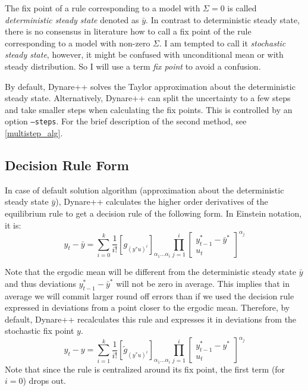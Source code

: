 \documentclass[10pt]{article}
\begin{document}
The fix point of a rule corresponding to a model with $\Sigma=0$ is
called {\it deterministic steady state} denoted as $\bar y$. In
contrast to deterministic steady state, there is no consensus in
literature how to call a fix point of the rule corresponding to a
model with non-zero $\Sigma$. I am tempted to call it {\it stochastic
  steady state}, however, it might be confused with unconditional mean
or with steady distribution. So I will use a term {\it fix point} to
avoid a confusion.

By default, Dynare++ solves the Taylor approximation about the
deterministic steady state. Alternatively, Dynare++ can split the
uncertainty to a few steps and take smaller steps when calculating the
fix points. This is controlled by an option {\tt --steps}. For the
brief description of the second method, see \ref{multistep_alg}.

\subsection{Decision Rule Form}
\label{dr_form}

In case of default solution algorithm (approximation about the
deterministic steady state $\bar y$), Dynare++ calculates the higher
order derivatives of the equilibrium rule to get a decision rule of
the following form. In Einstein notation, it is:
\[
y_t-\bar y = \sum_{i=0}^k\frac{1}{i!}\left[g_{(y^*u)^i}\right]
_{\alpha_1\ldots\alpha_i}
\prod_{j=1}^i\left[\begin{array}{c} y^*_{t-1}-\bar y^*\\ u_t \end{array}\right]
^{\alpha_j}
\]

Note that the ergodic mean will be different from the deterministic
steady state $\bar y$ and thus deviations $y^*_{t-1}-\bar y^*$ will
not be zero in average. This implies that in average we will commit
larger round off errors than if we used the decision rule expressed in
deviations from a point closer to the ergodic mean. Therefore, by
default, Dynare++ recalculates this rule and expresses it in
deviations from the stochastic fix point $y$.
\[
y_t-y = \sum_{i=1}^k\frac{1}{i!}\left[\tilde g_{(y^*u)^i}\right]
_{\alpha_1\ldots\alpha_i}
\prod_{j=1}^i\left[\begin{array}{c} y^*_{t-1}-y^*\\ u_t \end{array}\right]
^{\alpha_j}
\]
Note that since the rule is centralized around its fix point, the
first term (for $i=0$) drops out.
\end{document}
